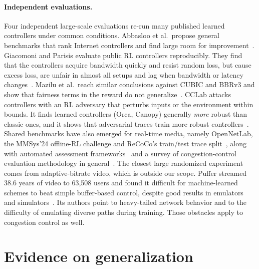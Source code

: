 \paragraph{Independent evaluations.} Four independent large-scale evaluations re-run many published learned controllers under common conditions. Abbasloo et al.\ propose general benchmarks that rank Internet controllers and find large room for improvement~\cite{abbasloo2023internet}. Giacomoni and Parisis evaluate public RL controllers reproducibly. They find that the controllers acquire bandwidth quickly and resist random loss, but cause excess loss, are unfair in almost all setups and lag when bandwidth or latency changes~\cite{giacomoni2024rlcc}. Mazilu et al.\ reach similar conclusions against CUBIC and BBRv3 and show that fairness terms in the reward do not generalize~\cite{mazilu2025learning}. CCLab attacks controllers with an RL adversary that perturbs inputs or the environment within bounds. It finds learned controllers (Orca, Canopy) generally \emph{more} robust than classic ones, and it shows that adversarial traces train more robust controllers~\cite{chen2026cclab}. Shared benchmarks have also emerged for real-time media, namely OpenNetLab, the MMSys'24 offline-RL challenge and ReCoCo's train/test trace split~\cite{eo2022opennetlab,khairy2024acm,markudova2026advancing}, along with automated assessment frameworks~\cite{pazhooheshy2025mahak} and a survey of congestion-control evaluation methodology in general~\cite{vielhaus2026evaluating}. The closest large randomized experiment comes from adaptive-bitrate video, which is outside our scope. Puffer streamed 38.6 years of video to 63,508 users and found it difficult for machine-learned schemes to beat simple buffer-based control, despite good results in emulators and simulators~\cite{yan2020learning}. Its authors point to heavy-tailed network behavior and to the difficulty of emulating diverse paths during training. Those obstacles apply to congestion control as well.

\section{Evidence on generalization}
\label{sec:generalization}

